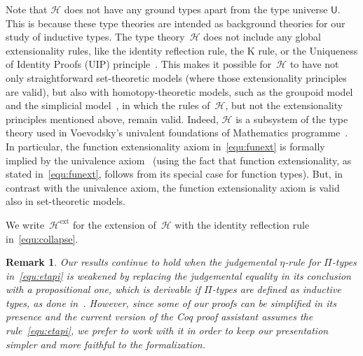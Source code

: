 \documentclass[10pt,a4paper,oneside,reqno]{amsart}
\numberwithin{equation}{section}
\theoremstyle{mythm}
\theoremstyle{mydef}
\theoremstyle{myrmk}
\newtheorem*{remark*}{Remark}
\newcommand{\Hint}{\mathcal{H}}
\newcommand{\Hext}{\mathcal{H}^{\mathrm{ext}}}
\newcommand{\U}{\mathsf{U}}
\begin{document}
\medskip

Note that $\Hint$ does not have any ground types apart from the type universe $\U$. This is because these type theories are intended as background
theories for our study of inductive types. The type theory~$\Hint$ 
does not include any global extensionality rules, like the identity reflection rule, the K rule, or 
the Uniqueness of Identity Proofs (UIP) principle~\cite{StreicherT:invitt}. This makes it possible
for~$\Hint$ to have not only straightforward set-theoretic models (where those extensionality
principles are valid), but also with homotopy-theoretic models, such as the groupoid model~\cite{HofmannM:gromtt}
and the simplicial model~\cite{ssets}, in which the rules of~$\Hint$, but not the extensionality principles mentioned above, remain valid. Indeed, $\Hint$ is a subsystem of the type theory 
used in Voevodsky's univalent foundations of Mathematics programme~\cite{VoevodskyV:unifc}. 
In particular, the 
function extensionality axiom in~\eqref{equ:funext} is formally implied by the univalence axiom~\cite{VoevodskyV:notts} (using the fact that function extensionality, as stated in~\eqref{equ:funext}, follows from its special case for function types). But, in contrast with the univalence
axiom, the function extensionality axiom is valid also in set-theoretic models. 

We write~$\Hext$ for the  extension of~$\Hint$ with the identity reflection rule in~\eqref{equ:collapse}.




\begin{remark*} Our results continue to hold when the judgemental $\eta$-rule for $\Pi$-types in~\eqref{equ:etapi}
is weakened by replacing the judgemental equality in its conclusion with a propositional one, which is
derivable if $\Pi$-types are defined as inductive types, as done in~\cite{NordstromB:promlt}. However, since
some of our proofs can be  simplified in its presence and the
current version of the Coq proof assistant assumes the rule~\eqref{equ:etapi}, 
we prefer to work with it in order to keep our presentation simpler and 
more faithful to the formalization.
\end{remark*}


 
\end{document}
